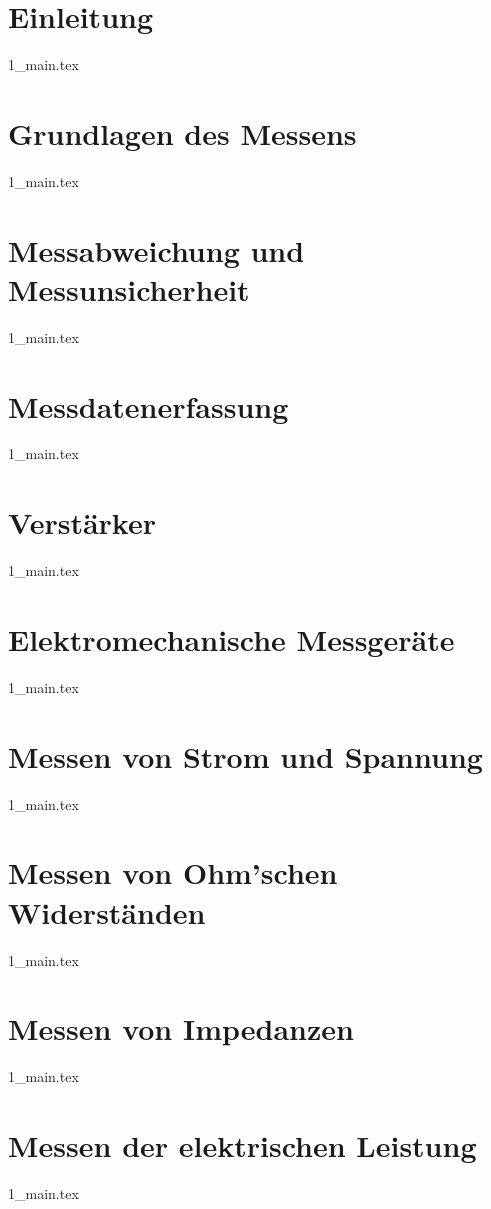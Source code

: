 \part{Einleitung}
{1_main.tex}

\part{Grundlagen des Messens}
{1_main.tex}

\part{Messabweichung und Messunsicherheit}
{1_main.tex}

\part{Messdatenerfassung}
{1_main.tex}

\part{Verstärker}
{1_main.tex}

\part{Elektromechanische Messgeräte}
{1_main.tex}

\part{Messen von Strom und Spannung}
{1_main.tex}

\part{Messen von Ohm'schen Widerständen}
{1_main.tex}

\part{Messen von Impedanzen}
{1_main.tex}

\part{Messen der elektrischen Leistung}
{1_main.tex}

